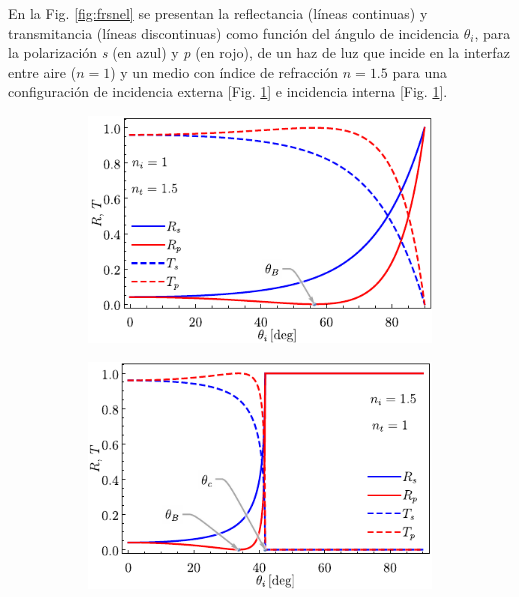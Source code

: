 En la Fig. \ref{fig:frsnel} se presentan la reflectancia (líneas continuas) y transmitancia (líneas discontinuas) como función del ángulo de incidencia $\theta_i$, para la polarización \emph{s} (en azul) y \emph{p} (en rojo), de un haz de luz que incide en la interfaz entre aire ($n=1$) y un medio con índice de refracción $n=1.5$ para una configuración de incidencia externa [Fig. \ref{sfig:frsnelExt}] e incidencia interna [Fig. \ref{sfig:frsnelExt}].
%
\begin{figure}[h!]\centering\hspace*{-1.5em}
	\begin{subfigure}{.05\textwidth}\vspace{-4.5cm}\caption{}\label{sfig:frsnelExt}\end{subfigure}
	\begin{subfigure}{.43\textwidth} \hspace*{-.7cm}
	\includegraphics[scale=1]{1-Teoria/figs/1-2-FrsnelExt}
	\end{subfigure}
	\begin{subfigure}{.05\textwidth}\vspace{-4.5cm}\caption{}\label{sfig:frsenlInt}\end{subfigure}
	\begin{subfigure}{.43\textwidth} \hspace*{-.7cm}
	\includegraphics[scale=1]{1-Teoria/figs/1-2-FrsnelInt}

\end{subfigure}
\end{figure}
